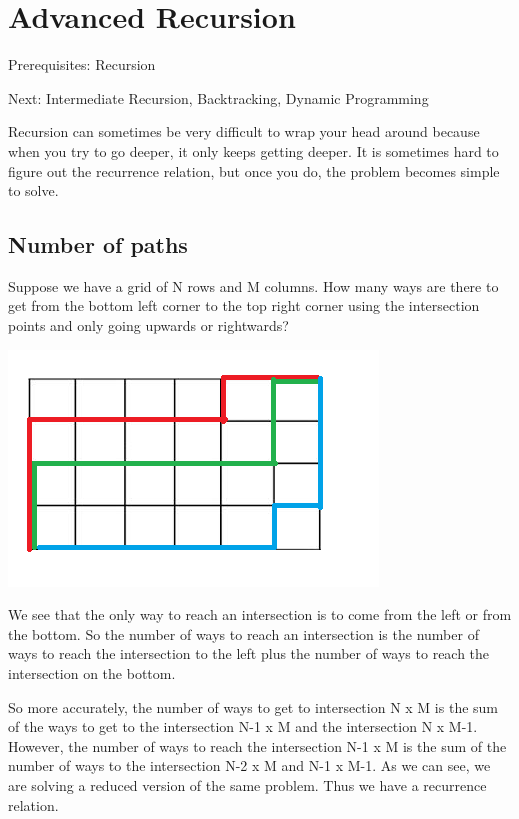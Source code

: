 \documentclass[11pt,oneside]{book}
\makeatletter
\def\maxwidth#1{\ifdim\Gin@nat@width>#1 #1\else\Gin@nat@width\fi}
\makeatother
\begin{document}
        \section{ Advanced Recursion }
        

Prerequisites: Recursion

Next: Intermediate Recursion, Backtracking, Dynamic Programming

Recursion can sometimes be very difficult to wrap your head around because when you try to go deeper, it only keeps getting deeper. It is sometimes hard to figure out the recurrence relation, but once you do, the problem becomes simple to solve.

\subsection{Number of paths}

Suppose we have a grid of N rows and M columns. How many ways are there to get from the bottom left corner to the top right corner using the intersection points and only going upwards or rightwards?

\vspace{5px}\includegraphics[width=\maxwidth{\textwidth}]{recursion_grid.png}

We see that the only way to reach an intersection is to come from the left or from the bottom. So the number of ways to reach an intersection is the number of ways to reach the intersection to the left plus the number of ways to reach the intersection on the bottom.

So more accurately, the number of ways to get to intersection N x M is the sum of the ways to get to the intersection N-1 x M and the intersection N x M-1. However, the number of ways to reach the intersection N-1 x M is the sum of the number of ways to the intersection N-2 x M and N-1 x M-1. As we can see, we are solving a reduced version of the same problem. Thus we have a recurrence relation.
\end{document}
